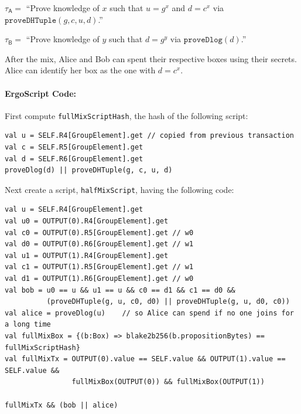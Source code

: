 \documentclass[11pt]{article}
\newcommand{\langname}{ErgoScript\xspace}
\newcommand{\mixname}{ErgoMix\xspace}
\begin{document}
\begin{enumerate}
\begin{enumerate}
		$\tau_\textsf{A} = $ ``Prove knowledge of $x$ such that $u = {g}^{x}$ and ${d} = {c}^{x}$ via $\texttt{proveDHTuple}(g, c, u, d)$.''
				
		$\tau_{\textsf{B}} = $ ``Prove knowledge of $y$ such that $d = {g}^{y}$ via $\texttt{proveDlog}(d)$.''
				
	\end{enumerate}

\end{enumerate}
	After the mix, Alice and Bob can spent their respective boxes using their secrets. 
	Alice can identify her box as the one with $d = c^x$. 

\paragraph{\langname Code:} First compute \texttt{fullMixScriptHash}, the hash of the following script:
\begin{verbatim}
val u = SELF.R4[GroupElement].get // copied from previous transaction
val c = SELF.R5[GroupElement].get 
val d = SELF.R6[GroupElement].get 
proveDlog(d) || proveDHTuple(g, c, u, d)
\end{verbatim}

Next create a script, \texttt{halfMixScript}, having the following code:
\begin{verbatim}
val u = SELF.R4[GroupElement].get
val u0 = OUTPUT(0).R4[GroupElement].get
val c0 = OUTPUT(0).R5[GroupElement].get // w0
val d0 = OUTPUT(0).R6[GroupElement].get // w1
val u1 = OUTPUT(1).R4[GroupElement].get 
val c1 = OUTPUT(1).R5[GroupElement].get // w1
val d1 = OUTPUT(1).R6[GroupElement].get // w0
val bob = u0 == u && u1 == u && c0 == d1 && c1 == d0 && 
          (proveDHTuple(g, u, c0, d0) || proveDHTuple(g, u, d0, c0))
val alice = proveDlog(u)    // so Alice can spend if no one joins for a long time
val fullMixBox = {(b:Box) => blake2b256(b.propositionBytes) == fullMixScriptHash}
val fullMixTx = OUTPUT(0).value == SELF.value && OUTPUT(1).value == SELF.value && 
                fullMixBox(OUTPUT(0)) && fullMixBox(OUTPUT(1))

fullMixTx && (bob || alice)
\end{verbatim}
\end{document}
